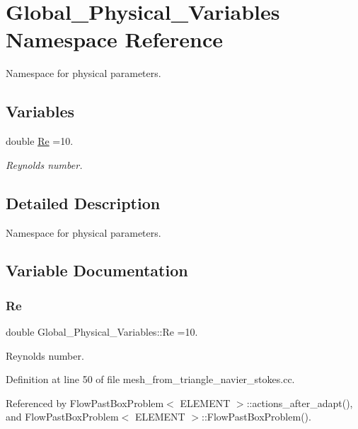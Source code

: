 \hypertarget{namespaceGlobal__Physical__Variables}{}\section{Global\+\_\+\+Physical\+\_\+\+Variables Namespace Reference}
\label{namespaceGlobal__Physical__Variables}


Namespace for physical parameters.  


\subsection*{Variables}
\begin{DoxyCompactItemize}
\item 
double \hyperlink{namespaceGlobal__Physical__Variables_ab814e627d2eb5bc50318879d19ab16b9}{Re} =10.
\begin{DoxyCompactList}\small\item\em Reynolds number. \end{DoxyCompactList}\end{DoxyCompactItemize}


\subsection{Detailed Description}
Namespace for physical parameters. 

\subsection{Variable Documentation}
\mbox{\label{namespaceGlobal__Physical__Variables_ab814e627d2eb5bc50318879d19ab16b9}} 
\subsubsection{\texorpdfstring{Re}{Re}}
{\footnotesize\ttfamily double Global\+\_\+\+Physical\+\_\+\+Variables\+::\+Re =10.}



Reynolds number. 



Definition at line 50 of file mesh\+\_\+from\+\_\+triangle\+\_\+navier\+\_\+stokes.\+cc.



Referenced by Flow\+Past\+Box\+Problem$<$ E\+L\+E\+M\+E\+N\+T $>$\+::actions\+\_\+after\+\_\+adapt(), and Flow\+Past\+Box\+Problem$<$ E\+L\+E\+M\+E\+N\+T $>$\+::\+Flow\+Past\+Box\+Problem().

